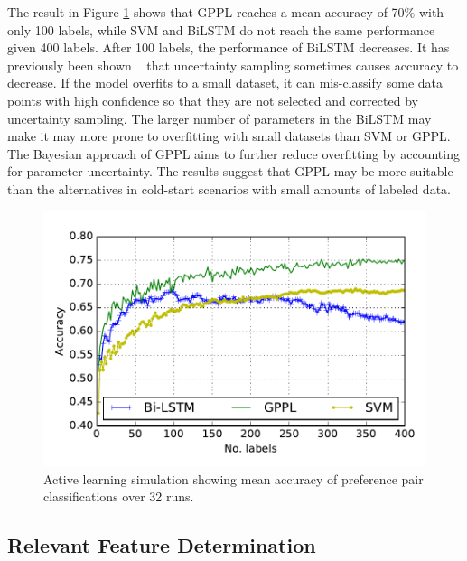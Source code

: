 The result in Figure \ref{fig:active_learning} shows that GPPL
reaches a mean accuracy of 70\% with only 100 labels, while SVM and BiLSTM do not reach the same performance given 400 labels. 
After 100 labels, the 
performance of BiLSTM decreases. It has previously been shown ~\cite{cawley2011baseline,guyon2011results,settles2010active} that uncertainty sampling sometimes causes accuracy to decrease. If the model overfits to a small dataset, 
it can mis-classify some data points with high confidence so that they are not selected and corrected by uncertainty sampling.  
The larger number of parameters in the BiLSTM may make it may more prone to overfitting with small datasets than SVM or GPPL. 
The Bayesian approach of GPPL aims to further 
reduce overfitting by accounting for parameter uncertainty.
The results suggest that GPPL may be more suitable than the alternatives in cold-start scenarios with small amounts of labeled data. 
\begin{figure}
\centering
\includegraphics[width=0.9\columnwidth,trim=13 15 10 22.5,clip=true]{figures/active_learning_2/test_acc}
\caption{Active learning simulation showing mean accuracy of preference pair classifications over 32 runs.}
\label{fig:active_learning}
\end{figure}

\subsection{Relevant Feature Determination}

